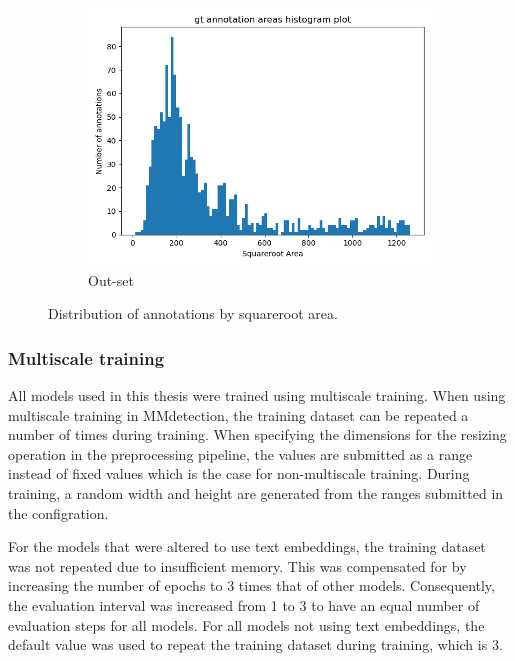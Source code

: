 \documentclass[oneside, english, bibtex]{kththesis}
\begin{document}
\begin{figure}[H]
\begin{adjustbox}{max width=1.5\linewidth,center}
\begin{subfigure}{.5\textwidth}
  \centering
  \includegraphics[width=\linewidth]{figures/annotation-histogram-outset.png}
  \caption{Out-set}
  \label{fig:size_dist_annotations_out}
\end{subfigure}
\end{adjustbox}
  \caption{Distribution of annotations by squareroot area. }
\label{fig:size_dist_annotations}
\end{figure}

\subsubsection{Multiscale training}

All models used in this thesis were trained using multiscale training. When using multiscale training in MMdetection, the training dataset can be repeated a number of times during training. When specifying the dimensions for the resizing operation in the preprocessing pipeline, the values are submitted as a range instead of fixed values which is the case for non-multiscale training. During training, a random width and height are generated from the ranges submitted in the configration. 

For the models that were altered to use text embeddings, the training dataset was not repeated due to insufficient memory. This was compensated for by increasing the number of epochs to 3 times that of other models. Consequently, the evaluation interval was increased from 1 to 3 to have an equal number of evaluation steps for all models. For all models not using text embeddings, the default value was used to repeat the training dataset during training, which is 3.
\end{document}
